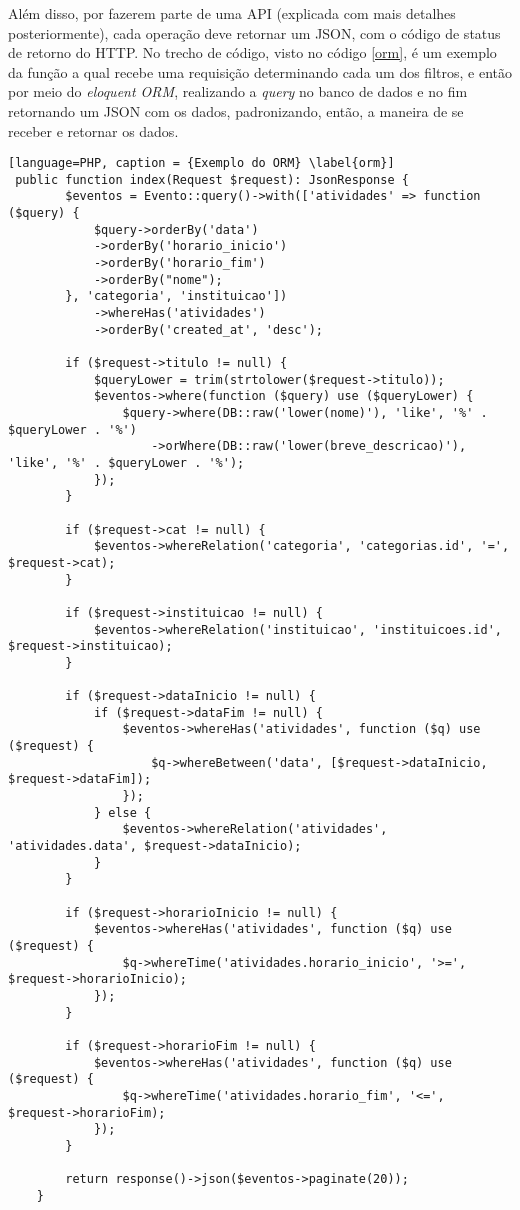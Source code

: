 Além disso, por fazerem parte de uma API (explicada com mais detalhes posteriormente), cada operação deve retornar um JSON, com o código de status de retorno do HTTP. No trecho de código, visto no código \ref{orm}, é um exemplo da função a qual recebe uma requisição determinando cada um dos filtros, e então por meio do \textit{eloquent ORM}, realizando a \textit{query} no banco de dados e no fim retornando um JSON com os dados, padronizando, então, a maneira de se receber e retornar os dados.
\begin{lstlisting}[language=PHP, caption = {Exemplo do ORM} \label{orm}]
 public function index(Request $request): JsonResponse {
        $eventos = Evento::query()->with(['atividades' => function ($query) {
            $query->orderBy('data')
            ->orderBy('horario_inicio')
            ->orderBy('horario_fim')
            ->orderBy("nome");
        }, 'categoria', 'instituicao'])
            ->whereHas('atividades')
            ->orderBy('created_at', 'desc');

        if ($request->titulo != null) {
            $queryLower = trim(strtolower($request->titulo));
            $eventos->where(function ($query) use ($queryLower) {
                $query->where(DB::raw('lower(nome)'), 'like', '%' . $queryLower . '%')
                    ->orWhere(DB::raw('lower(breve_descricao)'), 'like', '%' . $queryLower . '%');
            });
        }

        if ($request->cat != null) {
            $eventos->whereRelation('categoria', 'categorias.id', '=', $request->cat);
        }

        if ($request->instituicao != null) {
            $eventos->whereRelation('instituicao', 'instituicoes.id', $request->instituicao);
        }

        if ($request->dataInicio != null) {
            if ($request->dataFim != null) {
                $eventos->whereHas('atividades', function ($q) use ($request) {
                    $q->whereBetween('data', [$request->dataInicio, $request->dataFim]);
                });
            } else {
                $eventos->whereRelation('atividades', 'atividades.data', $request->dataInicio);
            }
        }

        if ($request->horarioInicio != null) {
            $eventos->whereHas('atividades', function ($q) use ($request) {
                $q->whereTime('atividades.horario_inicio', '>=', $request->horarioInicio);
            });
        }

        if ($request->horarioFim != null) {
            $eventos->whereHas('atividades', function ($q) use ($request) {
                $q->whereTime('atividades.horario_fim', '<=', $request->horarioFim);
            });
        }

        return response()->json($eventos->paginate(20));
    }
\end{lstlisting}

